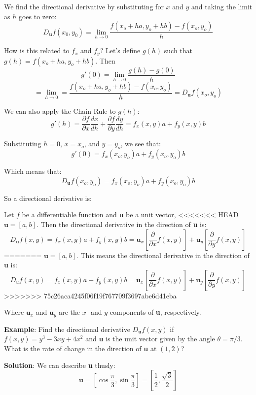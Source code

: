 We find the directional derivative by substituting for $x$ and $y$ and taking 
the limit as $h$ goes to zero:
$$D_{\textbf{u}} f(x_0, y_0) = \lim_{h \to 0} \frac{f(x_o + ha, y_o + hb) - 
f(x_o, y_o)}{h}$$

How is this related to $f_x$ and $f_y$? Let's define $g(h)$ such that $g(h) = 
f(x_o + ha, y_o + hb)$. Then
$$g'(0) = \lim_{h \to 0} \frac{g(h) - g(0)}{h}$$
$$= \lim_{h \to 0} = \frac{f(x_o + ha, y_o + hb) - f(x_o, y_o)}{h} = 
D_{\textbf{u}} f(x_o, y_o)$$

We can also apply the Chain Rule to $g(h)$:
$$g'(h) = \frac{\partial f}{\partial x} \frac{dx}{dh} + \frac{\partial f}{
\partial y} \frac{dy}{dh} = f_x(x, y)a + f_y(x, y)b$$

Substituting $h = 0$, $x = x_o$, and $y = y_o$, we see that:
$$g'(0) = f_x(x_o, y_o)a + f_y(x_o, y_o)b$$

Which means that:
$$D_{\textbf{u}} f(x_o, y_o) = f_x(x_o, y_o)a + f_y(x_o, y_o)b$$

So a directional derivative is:

\begin{mdframed}[style = important, frametitle = {The Directional Derivative}]
Let $f$ be a differentiable function and \textbf{u} be a unit vector, 
<<<<<<< HEAD
$\textbf{u} = \left[ a, b \right]$. Then the directional derivative in the 
direction of \textbf{u} is:
$$D_{\textbf{u}} f(x, y) = f_x(x, y)a + f_y(x, y)b = \textbf{u}_x \left[ 
\frac{\partial}{\partial x} f(x, y) \right] + \textbf{u}_y \left[ \frac{
\partial}{\partial y} f(x, y) \right]$$
=======
$\textbf{u} = \left[ a, b \right]$. This means the directional derivative in the direction of 
\textbf{u} is:
$$D_u f(x, y) = f_x(x, y)a + f_y(x, y)b = \textbf{u}_x \left[ \frac{\partial}{
\partial x} f(x, y) \right] + \textbf{u}_y \left[ \frac{\partial}{\partial y} 
f(x, y) \right]$$
>>>>>>> 75c26aca4245f06f19f767709f3697abe6d41eba
\end{mdframed}

Where $\textbf{u}_x$ and $\textbf{u}_y$ are the $x$- and $y$-components of 
\textbf{u}, respectively. 

\textbf{Example}: Find the directional derivative $D_{\textbf{u}} f(x, y)$ if 
$f(x, y) = y^3 - 3xy + 4x^2$ and \textbf{u} is the unit vector given by the 
angle $\theta = \pi/3$. What is the rate of change in the direction of 
\textbf{u} at $(1, 2)$?

\textbf{Solution}: We can describe \textbf{u} thusly:
$$\textbf{u} = \left[ \cos{ \frac{\pi}{3} }, \sin{ \frac{\pi}{3}} \right] = 
\left[ \frac{1}{2}, \frac{\sqrt{3}}{2} \right]$$

